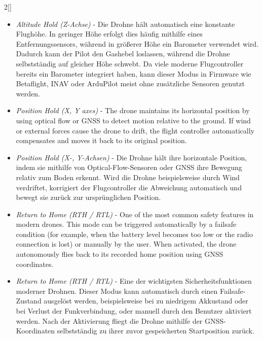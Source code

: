 \begin{paracol}{2}[]
\colger

\begin{itemize}
\item \textsl{Altitude Hold (Z-Achse)} - Die Drohne hält automatisch eine konstante Flughöhe. In geringer Höhe erfolgt dies häufig mithilfe eines Entfernungssensors, während in größerer Höhe ein Barometer verwendet wird. Dadurch kann der Pilot den Gashebel loslassen, während die Drohne selbstständig auf gleicher Höhe schwebt. Da viele moderne Flugcontroller bereits ein Barometer integriert haben, kann dieser Modus in Firmware wie Betaflight, INAV oder ArduPilot meist ohne zusätzliche Sensoren genutzt werden.
\end{itemize}

\coleng

\begin{itemize}
\item \textsl{Position Hold (X, Y axes)} - The drone maintains its horizontal position by using optical flow or GNSS to detect motion relative to the ground. If wind or external forces cause the drone to drift, the flight controller automatically compensates and moves it back to its original position.
\end{itemize}

\colger

\begin{itemize}
\item \textsl{Position Hold (X-, Y-Achsen)} - Die Drohne hält ihre horizontale Position, indem sie mithilfe von Optical-Flow-Sensoren oder GNSS ihre Bewegung relativ zum Boden erkennt. Wird die Drohne beispielsweise durch Wind verdriftet, korrigiert der Flugcontroller die Abweichung automatisch und bewegt sie zurück zur ursprünglichen Position.
\end{itemize}

\coleng

\begin{itemize}
\item \textsl{Return to Home (RTH / RTL)} - One of the most common safety features in modern drones. This mode can be triggered automatically by a failsafe condition (for example, when the battery level becomes too low or the radio connection is lost) or manually by the user. When activated, the drone autonomously flies back to its recorded home position using GNSS coordinates.
\end{itemize}

\colger

\begin{itemize}
\item \textsl{Return to Home (RTH / RTL)} - Eine der wichtigsten Sicherheitsfunktionen moderner Drohnen. Dieser Modus kann automatisch durch einen Failsafe-Zustand ausgelöst werden, beispielsweise bei zu niedrigem Akkustand oder bei Verlust der Funkverbindung, oder manuell durch den Benutzer aktiviert werden. Nach der Aktivierung fliegt die Drohne mithilfe der GNSS-Koordinaten selbstständig zu ihrer zuvor gespeicherten Startposition zurück.
\end{itemize}


\end{paracol}
